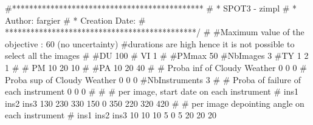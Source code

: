 #*********************************************
# * SPOT3 - zimpl
# * Author: fargier
# * Creation Date:
# *********************************************/
#
#Maximum value of the objective : 60 (no uncertainty)
#durations are high hence it is not possible to select all the images
#
#DU
100
# VI
1
#
#PMmax
50
#NbImages
3
#TY
1
2
1
#
# PM
10
20
10
#
#PA
10
20
40
#
# Proba inf of Cloudy Weather
0
0
0
# Proba sup of Cloudy Weather
0
0
0
#NbInstruments
3
#
# Proba of failure of each instrument
0
0
0
#
#
# per image, start date on each instrument
# ins1 ins2 ins3
130 230 330
150 0 350
220 320 420
#
# per image depointing angle on each instrument
# ins1 ins2 ins3
10 10 10
5 0 5
20 20 20 